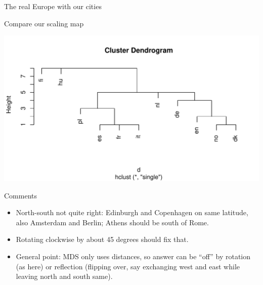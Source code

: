 \begin{frame}[fragile]{The real Europe with our cities}
  
\begin{knitrout}
\color{fgcolor}\begin{kframe}
\begin{alltt}
\end{alltt}


{\ttfamily\noindent\bfseries\color{errorcolor}{\#\# Error in eval(expr, envir, enclos): object 'g2' not found}}\end{kframe}
\end{knitrout}
\end{frame}

\begin{frame}[fragile]{Compare our scaling map}
  
\begin{knitrout}
\color{fgcolor}
\includegraphics[width=\maxwidth]{figure/unnamed-chunk-10-1} 

\end{knitrout}
  
\end{frame}


\begin{frame}[fragile]{Comments}
  
  \begin{itemize}
  \item North-south not quite right: Edinburgh and Copenhagen on same
    latitude, also Amsterdam and Berlin; Athens should be south of Rome.
  \item Rotating clockwise by about 45 degrees should fix that.
  \item General point: MDS only uses distances, so answer can be
    ``off'' by rotation (as here) or reflection (flipping over, say
    exchanging west and east while leaving north and south same). 
  \end{itemize} 
  
\end{frame}

